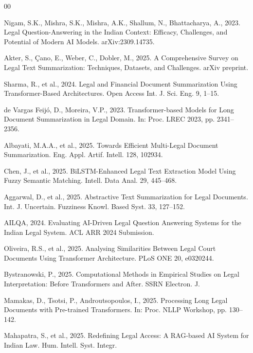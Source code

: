 \documentclass[preprint,12pt]{elsarticle}
\begin{document}
\begin{thebibliography}{00}

Nigam, S.K., Mishra, S.K., Mishra, A.K., Shallum, N., Bhattacharya, A., 2023. Legal Question-Answering in the Indian Context: Efficacy, Challenges, and Potential of Modern AI Models. arXiv:2309.14735.

Akter, S., Çano, E., Weber, C., Dobler, M., 2025. A Comprehensive Survey on Legal Text Summarization: Techniques, Datasets, and Challenges. arXiv preprint.

Sharma, R., et al., 2024. Legal and Financial Document Summarization Using Transformer-Based Architectures. Open Access Int. J. Sci. Eng. 9, 1--15.

de Vargas Feijó, D., Moreira, V.P., 2023. Transformer-based Models for Long Document Summarization in Legal Domain. In: Proc. LREC 2023, pp. 2341--2356.

Albayati, M.A.A., et al., 2025. Towards Efficient Multi-Legal Document Summarization. Eng. Appl. Artif. Intell. 128, 102934.

Chen, J., et al., 2025. BiLSTM-Enhanced Legal Text Extraction Model Using Fuzzy Semantic Matching. Intell. Data Anal. 29, 445--468.

Aggarwal, D., et al., 2025. Abstractive Text Summarization for Legal Documents. Int. J. Uncertain. Fuzziness Knowl. Based Syst. 33, 127--152.

AILQA, 2024. Evaluating AI-Driven Legal Question Answering Systems for the Indian Legal System. ACL ARR 2024 Submission.

Oliveira, R.S., et al., 2025. Analysing Similarities Between Legal Court Documents Using Transformer Architecture. PLoS ONE 20, e0320244.

Bystranowski, P., 2025. Computational Methods in Empirical Studies on Legal Interpretation: Before Transformers and After. SSRN Electron. J.

Mamakas, D., Tsotsi, P., Androutsopoulos, I., 2025. Processing Long Legal Documents with Pre-trained Transformers. In: Proc. NLLP Workshop, pp. 130--142.

Mahapatra, S., et al., 2025. Redefining Legal Access: A RAG-based AI System for Indian Law. Hum. Intell. Syst. Integr.


\end{thebibliography}
\end{document}
